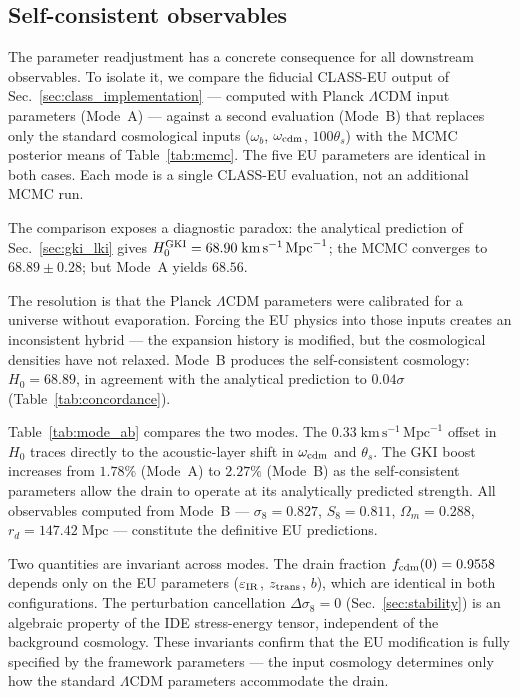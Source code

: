 \documentclass[a4paper,fleqn]{cas-dc}
\newcommand{\ztrans}{z_{\rm trans}}
\begin{document}
\subsection{Self-consistent observables}
\label{sec:mode_b}

The parameter readjustment has a concrete consequence for
all downstream observables. To isolate it, we compare the
fiducial CLASS-EU output of Sec.~\ref{sec:class_implementation}
--- computed with Planck $\Lambda$CDM input parameters
(Mode~A) --- against a second evaluation (Mode~B) that
replaces only the standard cosmological inputs
($\omega_b$, $\omega_{\rm cdm}$, $100\theta_s$) with the
MCMC posterior means of Table~\ref{tab:mcmc}. The five EU
parameters are identical in both cases. Each mode is a
single CLASS-EU evaluation, not an additional MCMC run.

The comparison exposes a diagnostic paradox:
the analytical prediction of Sec.~\ref{sec:gki_lki}
gives $H_0^{\rm GKI} = 68.90\;\text{km}\,\text{s}^{-1}\,\text{Mpc}^{-1}$; the MCMC
converges to $68.89 \pm 0.28$; but Mode~A yields $68.56$.

The resolution is that the Planck $\Lambda$CDM parameters
were calibrated for a universe without evaporation. Forcing
the EU physics into those inputs creates an inconsistent
hybrid --- the expansion history is modified, but the
cosmological densities have not relaxed. Mode~B produces
the self-consistent cosmology: $H_0 = 68.89$, in agreement
with the analytical prediction to $0.04\sigma$
(Table~\ref{tab:concordance}).

Table~\ref{tab:mode_ab} compares the two modes. The
$0.33\;\text{km}\,\text{s}^{-1}\,\text{Mpc}^{-1}$ offset in $H_0$ traces directly
to the acoustic-layer shift in $\omega_{\rm cdm}$ and
$\theta_s$. The GKI boost increases from $1.78\%$
(Mode~A) to $2.27\%$ (Mode~B) as the self-consistent
parameters allow the drain to operate at its analytically
predicted strength. All observables computed from Mode~B
--- $\sigma_8 = 0.827$, $S_8 = 0.811$,
$\Omega_m = 0.288$, $r_d = 147.42\;\text{Mpc}$ ---
constitute the definitive EU predictions.

Two quantities are invariant across modes. The drain
fraction $f_{\rm cdm}(0) = 0.9558$ depends only on the
EU parameters ($\varepsilon_{\rm IR}$, $\ztrans$, $b$),
which are identical in both configurations. The
perturbation cancellation $\Delta\sigma_8 = 0$
(Sec.~\ref{sec:stability}) is an algebraic property
of the IDE stress-energy tensor, independent of the
background cosmology. These invariants confirm that the
EU modification is fully specified by the framework
parameters --- the input cosmology determines only how
the standard $\Lambda$CDM parameters accommodate the
drain.
\end{document}
